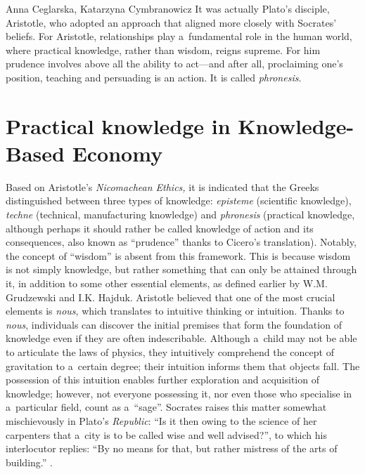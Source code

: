 \begin{artengenv2auth}{Anna Ceglarska, Katarzyna Cymbranowicz}
It was actually Plato's disciple, Aristotle, who adopted an approach that aligned more closely with Socrates' beliefs. For Aristotle, relationships play a~fundamental role in the human world, where practical knowledge, rather than wisdom, reigns supreme. For him prudence involves above all the ability to act---and after all, proclaiming one's position, teaching and persuading is an action. It is called \textit{phronesis}.



\section{Practical knowledge in Knowledge-Based Economy}

Based on Aristotle's \textit{Nicomachean Ethics,} it is indicated that the Greeks distinguished between three types of knowledge: \textit{episteme} (scientific knowledge), \textit{techne} (technical, manufacturing knowledge) and \textit{phronesis} (practical knowledge, although perhaps it should rather be called knowledge of action and its consequences, also known as ``prudence'' thanks to Cicero's translation). Notably, the concept of ``wisdom'' is absent from this framework. This is because wisdom is not simply knowledge, but rather something that can only be attained through it, in addition to some other essential elements, as defined earlier by W.M. Grudzewski and I.K. Hajduk. Aristotle believed that one of the most crucial elements is \textit{nous}, which translates to intuitive thinking or intuition. Thanks to \textit{nous}, individuals can discover the initial premises that form the foundation of knowledge even if they are often indescribable. Although a~child may not be able to articulate the laws of physics, they intuitively comprehend the concept of gravitation to a~certain degree; their intuition informs them that objects fall. The possession of this intuition enables further exploration and acquisition of knowledge; however, not everyone possessing it, nor even those who specialise in a~particular field, count as a~``sage''. Socrates raises this matter somewhat mischievously in Plato's \textit{Republic}: ``Is it then owing to the science of her carpenters that a~city is to be called wise and well advised?'', to which his interlocutor replies: ``By no means for that, but rather mistress of the arts of building.'' 
\parencite[][IV, 428b-c]{plato_plato_1969}.%





\end{artengenv2auth}

